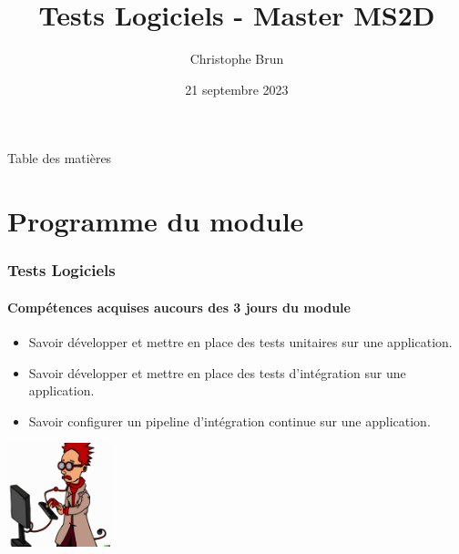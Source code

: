 \documentclass{beamer}
\title{Tests Logiciels - Master MS2D}
\author{Christophe Brun}
\institute{Campus Saint-Michel IT}
\date{21 septembre 2023}
\begin{document}
    \begin{frame}
        \transdissolve
        \titlepage
    \end{frame}

    \begin{frame}{Table des matières}
        \tableofcontents
    \end{frame}


    \section{Programme du module}\label{sec:programme-du-module}
    \begin{frame}
        \frametitle{Tests Logiciels}
        \framesubtitle{Compétences acquises aucours des 3 jours du module}
        \transdissolve
        \begin{itemize}
            \item Savoir développer et mettre en place des tests unitaires sur une application.

            \item Savoir développer et mettre en place des tests d’intégration sur une application.

            \item Savoir configurer un pipeline d’intégration continue sur une application.

        \end{itemize}
        \centering
        \includegraphics[width=3cm]{image/funny-cartoon-of-a-smart-young-computer-scientist}
    \end{frame}
\end{document}
